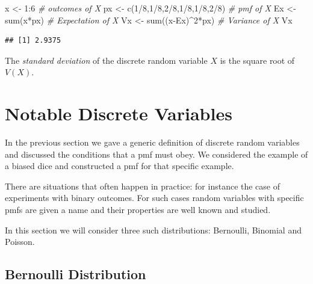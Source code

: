 \documentclass[
]{book}
\newenvironment{Shaded}{\begin{snugshade}}{\end{snugshade}}
\newcommand{\CommentTok}[1]{\textcolor[rgb]{0.56,0.35,0.01}{\textit{#1}}}
\newcommand{\DecValTok}[1]{\textcolor[rgb]{0.00,0.00,0.81}{#1}}
\newcommand{\FunctionTok}[1]{\textcolor[rgb]{0.00,0.00,0.00}{#1}}
\newcommand{\NormalTok}[1]{#1}
\newcommand{\OtherTok}[1]{\textcolor[rgb]{0.56,0.35,0.01}{#1}}
\newcommand{\SpecialCharTok}[1]{\textcolor[rgb]{0.00,0.00,0.00}{#1}}
\theoremstyle{definition}
\theoremstyle{definition}
\theoremstyle{definition}
\theoremstyle{definition}
\theoremstyle{remark}
\begin{document}
\begin{Shaded}
\begin{Highlighting}[]
\NormalTok{x }\OtherTok{\textless{}{-}} \DecValTok{1}\SpecialCharTok{:}\DecValTok{6}  \CommentTok{\# outcomes of X}
\NormalTok{px }\OtherTok{\textless{}{-}} \FunctionTok{c}\NormalTok{(}\DecValTok{1}\SpecialCharTok{/}\DecValTok{8}\NormalTok{,}\DecValTok{1}\SpecialCharTok{/}\DecValTok{8}\NormalTok{,}\DecValTok{2}\SpecialCharTok{/}\DecValTok{8}\NormalTok{,}\DecValTok{1}\SpecialCharTok{/}\DecValTok{8}\NormalTok{,}\DecValTok{1}\SpecialCharTok{/}\DecValTok{8}\NormalTok{,}\DecValTok{2}\SpecialCharTok{/}\DecValTok{8}\NormalTok{)  }\CommentTok{\# pmf of X}
\NormalTok{Ex }\OtherTok{\textless{}{-}} \FunctionTok{sum}\NormalTok{(x}\SpecialCharTok{*}\NormalTok{px)  }\CommentTok{\# Expectation of X}
\NormalTok{Vx }\OtherTok{\textless{}{-}} \FunctionTok{sum}\NormalTok{((x}\SpecialCharTok{{-}}\NormalTok{Ex)}\SpecialCharTok{\^{}}\DecValTok{2}\SpecialCharTok{*}\NormalTok{px)  }\CommentTok{\# Variance of X}
\NormalTok{Vx}
\end{Highlighting}
\end{Shaded}

\begin{verbatim}
## [1] 2.9375
\end{verbatim}

The \emph{standard deviation} of the discrete random variable \(X\) is the square root of \(V(X)\).

\hypertarget{notable-discrete-variables}{%
\section{Notable Discrete Variables}\label{notable-discrete-variables}}

In the previous section we gave a generic definition of discrete random variables and discussed the conditions that a pmf must obey. We considered the example of a biased dice and constructed a pmf for that specific example.

There are situations that often happen in practice: for instance the case of experiments with binary outcomes. For such cases random variables with specific pmfs are given a name and their properties are well known and studied.

In this section we will consider three such distributions: Bernoulli, Binomial and Poisson.

\hypertarget{bernoulli-distribution}{%
\subsection{Bernoulli Distribution}\label{bernoulli-distribution}}
\end{document}
